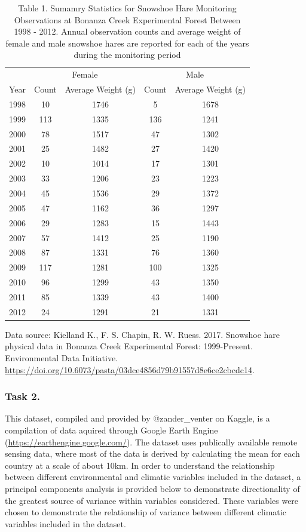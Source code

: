\documentclass[]{article}
\begin{document}
\begin{table}

\caption{\label{tab:unnamed-chunk-3}Table 1. Sumamry Statistics for Snowshoe Hare Monitoring Observations at Bonanza Creek Experimental Forest Between 1998 - 2012. Annual observation counts and average weight of female and male snowshoe hares are reported for each of the years during the monitoring period}
\centering
\begin{tabular}[t]{c|c|c|c|c}
\hline
\multicolumn{1}{c|}{ } & \multicolumn{2}{c|}{Female} & \multicolumn{2}{c}{Male} \\
\cline{2-3} \cline{4-5}
Year & Count & Average Weight (g) & Count & Average Weight (g)\\
\hline
1998 & 10 & 1746 & 5 & 1678\\
\hline
1999 & 113 & 1335 & 136 & 1241\\
\hline
2000 & 78 & 1517 & 47 & 1302\\
\hline
2001 & 25 & 1482 & 27 & 1420\\
\hline
2002 & 10 & 1014 & 17 & 1301\\
\hline
2003 & 33 & 1206 & 23 & 1223\\
\hline
2004 & 45 & 1536 & 29 & 1372\\
\hline
2005 & 47 & 1162 & 36 & 1297\\
\hline
2006 & 29 & 1283 & 15 & 1443\\
\hline
2007 & 57 & 1412 & 25 & 1190\\
\hline
2008 & 87 & 1331 & 76 & 1360\\
\hline
2009 & 117 & 1281 & 100 & 1325\\
\hline
2010 & 96 & 1299 & 43 & 1350\\
\hline
2011 & 85 & 1339 & 43 & 1400\\
\hline
2012 & 24 & 1291 & 21 & 1331\\
\hline
\end{tabular}
\end{table}

Data source: Kielland K., F. S. Chapin, R. W. Ruess. 2017. Snowshoe hare
physical data in Bonanza Creek Experimental Forest: 1999-Present.
Environmental Data Initiative.
\url{https://doi.org/10.6073/pasta/03dce4856d79b91557d8e6ce2cbcdc14}.

\subsubsection{Task 2.}\label{task-2.}

This dataset, compiled and provided by @zander\_venter on Kaggle, is a
compilation of data aquired through Google Earth Engine
(\url{https://earthengine.google.com/}). The dataset uses publically
available remote sensing data, where most of the data is derived by
calculating the mean for each country at a scale of about 10km. In order
to understand the relationship between different environmental and
climatic variables included in the dataset, a principal components
analysis is provided below to demonstrate directionality of the greatest
source of variance within variables considered. These variables were
chosen to demonstrate the relationship of variance between different
climatic variables included in the dataset.
\end{document}
